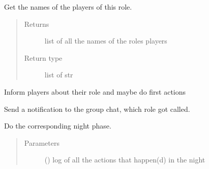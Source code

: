 \documentclass[letterpaper,10pt,english]{sphinxmanual}
\begin{document}
\begin{fulllineitems}
\begin{fulllineitems}
\end{fulllineitems}



\begin{fulllineitems}
Get the names of the players of this role.
\begin{quote}\begin{description}
\item[{Returns}] \leavevmode
list of all the names of the roles players

\item[{Return type}] \leavevmode
list of str

\end{description}\end{quote}

\end{fulllineitems}



\begin{fulllineitems}
Inform players about their role and maybe do first actions

\end{fulllineitems}



\begin{fulllineitems}
\end{fulllineitems}



\begin{fulllineitems}
Send a notification to the group chat, which role got called.

\end{fulllineitems}



\begin{fulllineitems}
\end{fulllineitems}



\begin{fulllineitems}
Do the corresponding night phase.
\begin{quote}\begin{description}
\item[{Parameters}] \leavevmode
{} ({\hyperref[\detokenize{chatwolf:chatwolf.nightactions.Nightactions}]{}}) \textendash{} log of all the actions that happen(d) in the night


\end{description}
\end{quote}
\end{fulllineitems}
\end{fulllineitems}
\end{document}
